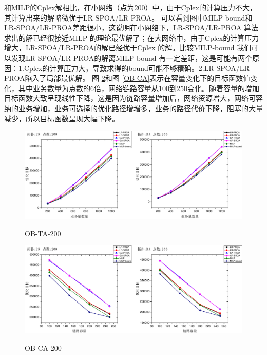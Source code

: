 和MILP的Cplex解相比，在小网络（点为200）中，由于Cplex的计算压力不大，其计算出来的解略微优于LR-SPOA/LR-PROA。
 可以看到图中MILP-bound和LR-SPOA/LR-PROA差距很小，这说明在小网络下，LR-SPOA/LR-PROA 算法求出的解已经很接近MILP 的理论最优解了；在大网络中，由于Cplex的计算压力增大，LR-SPOA/LR-PROA的解已经优于Cplex 的解。比较MILP-bound 我们可以发现LR-SPOA/LR-PROA的解离MILP-bound 有一定差距，这是可能有两个原因：1.Cplex的计算压力大，导致求得的bound可能不够精确。2.LR-SPOA/LR-PROA陷入了局部最优解。
图 \ref{OB-CA-200}和图 \ref{OB-CA}表示在容量变化下的目标函数值变化，其中业务数量为点数的6倍，网络链路容量从100到250变化。随着容量的增加目标函数大致呈现线性下降，这是因为链路容量增加后，网络资源增大，网络可容纳的业务增加，业务可选择的优化路径增增多，业务的路径代价下降，阻塞的大量减少，所以目标函数呈现大幅下降。
\begin{figure}
\setlength{\belowcaptionskip}{-0.1cm}
  \begin{center}
    {\includegraphics[width=1 \textwidth]{figures/OB-TA-200.pdf}}
    \end{center}
  \caption{{\footnotesize{OB-TA-200}}}
  \label{OB-TA-200}
\end{figure}
 \begin{figure}
\setlength{\belowcaptionskip}{-0.1cm}
  \begin{center}
    {\includegraphics[width=1 \textwidth]{figures/OB-CA-200.pdf}}
    \end{center}
  \caption{{\footnotesize{OB-CA-200}}}
  \label{OB-CA-200}
\end{figure}
